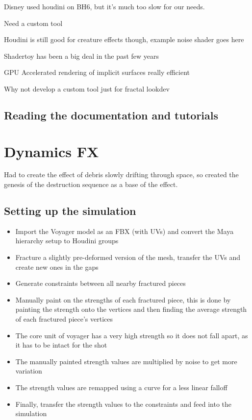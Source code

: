 \documentclass[11pt,a4paper,final,notitlepage]{report}
\begin{document}
Disney used houdini on BH6, but it's much too slow for our needs.

Need a custom tool

Houdini is still good for creature effects though, example noise shader goes here

Shadertoy has been a big deal in the past few years

GPU Accelerated rendering of implicit surfaces really efficient

Why not develop a custom tool just for fractal lookdev

\section{Reading the documentation and tutorials}











\chapter{Dynamics FX}

Had to create the effect of debris slowly drifting through space, so created the genesis of the destruction sequence as a base of the effect.

\section{Setting up the simulation}
\begin{itemize}
	\item Import the Voyager model as an FBX (with UVs) and convert the Maya hierarchy setup to Houdini groups
	\item Fracture a slightly pre-deformed version of the mesh, transfer the UVs and create new ones in the gaps
	\item Generate constraints between all nearby fractured pieces
	\item Manually paint on the strengths of each fractured piece, this is done by painting the strength onto the vertices and then finding the average strength of each fractured piece's vertices
	\item The core unit of voyager has a very high strength so it does not fall apart, as it has to be intact for the shot
	\item The manually painted strength values are multiplied by noise to get more variation
	\item The strength values are remapped using a curve for a less linear falloff
	\item Finally, transfer the strength values to the constraints and feed into the simulation
\end{itemize}
\end{document}
